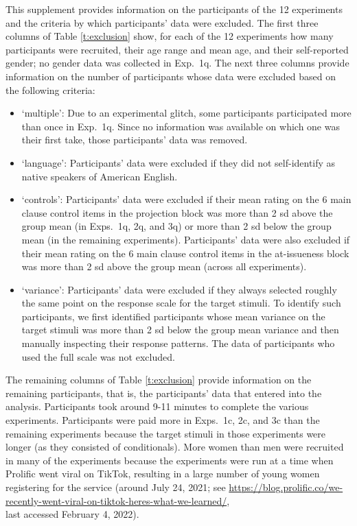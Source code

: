 \documentclass[a4paper,12pt,twoside]{article}
\begin{document}
    This supplement provides information on the participants of the 12 experiments and the criteria by which participants' data were excluded. The first three columns of Table \ref{t:exclusion} show, for each of the 12 experiments how many participants were recruited, their age range and mean age, and their self-reported gender; no gender data was collected in Exp.~1q. The next three columns provide information on the number of participants whose data were excluded based on the following criteria:
    
    \begin{itemize}%
        
        \item `multiple': Due to an experimental glitch, some participants participated more than once in Exp.~1q. Since no information was available on which one was their first take, those participants' data was removed. 
        
        \item `language': Participants' data were excluded if they did not self-identify as native speakers of American English.
        
        \item `controls': Participants' data were excluded if their mean rating on the 6 main clause control items in the projection block was more than 2 sd above the group mean (in Exps.~1q, 2q, and 3q) or more than 2 sd below the group mean (in the remaining experiments). Participants' data were also excluded if their mean rating on the 6 main clause control items in the at-issueness block was more than 2 sd above the group mean (across all experiments).
         
        \item `variance': Participants' data were excluded if they always selected roughly the same point on the response scale for the target stimuli. To identify such participants, we first identified participants whose mean variance on the target stimuli was more than 2 sd below the group mean variance and then manually inspecting their response patterns. The data of participants who used the full scale was not excluded. 
        
    \end{itemize}

    The remaining columns of Table \ref{t:exclusion} provide information on the remaining participants, that is, the participants' data that entered into the analysis. Participants took around 9-11 minutes to complete the various experiments. Participants were paid more in Exps.~1c, 2c, and 3c than the remaining experiments because the target stimuli in those experiments were longer (as they consisted of conditionals). More women than men were recruited in many of the experiments because the experiments were run at a time when Prolific went viral on TikTok, resulting in a large number of young women registering for the service (around July 24, 2021; see \url{https://blog.prolific.co/we-recently-went-viral-on-tiktok-heres-what-we-learned/}, \\ last accessed February 4, 2022).  
\end{document}
